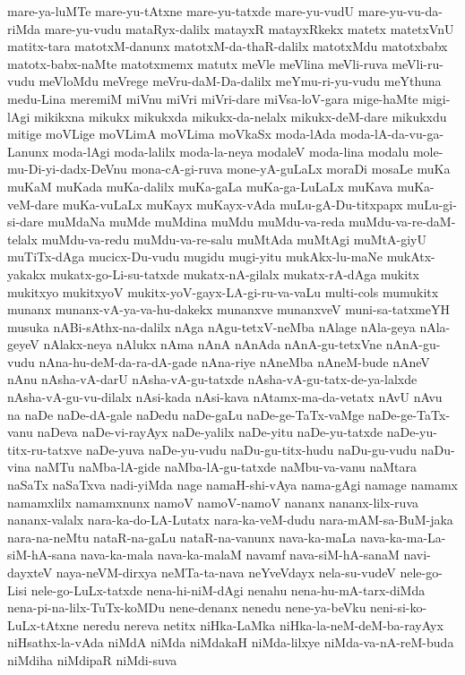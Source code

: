 {mare-ya-luMTe
mare-yu-tAtxne
mare-yu-tatxde
mare-yu-vudU
mare-yu-vu-da-riMda
mare-yu-vudu
mataRyx-dalilx
matayxR
matayxRkekx
matetx
matetxVnU
matitx-tara
matotxM-danunx
matotxM-da-thaR-dalilx
matotxMdu
matotxbabx
matotx-babx-naMte
matotxmemx
matutx
meVle
meVlina
meVli-ruva
meVli-ru-vudu
meVloMdu
meVrege
meVru-daM-Da-dalilx
meYmu-ri-yu-vudu
meYthuna
medu-Lina
meremiM
miVnu
miVri
miVri-dare
miVsa-loV-gara
mige-haMte
migi-lAgi
mikikxna
mikukx
mikukxda
mikukx-da-nelalx
mikukx-deM-dare
mikukxdu
mitige
moVLige
moVLimA
moVLima
moVkaSx
moda-lAda
moda-lA-da-vu-ga-Lanunx
moda-lAgi
moda-lalilx
moda-la-neya
modaleV
moda-lina
modalu
mole-mu-Di-yi-dadx-DeVnu
mona-cA-gi-ruva
mone-yA-guLaLx
moraDi
mosaLe
muKa
muKaM
muKada
muKa-dalilx
muKa-gaLa
muKa-ga-LuLaLx
muKava
muKa-veM-dare
muKa-vuLaLx
muKayx
muKayx-vAda
muLu-gA-Du-titxpapx
muLu-gi-si-dare
muMdaNa
muMde
muMdina
muMdu
muMdu-va-reda
muMdu-va-re-daM-telalx
muMdu-va-redu
muMdu-va-re-salu
muMtAda
muMtAgi
muMtA-giyU
muTiTx-dAga
mucicx-Du-vudu
mugidu
mugi-yitu
mukAkx-lu-maNe
mukAtx-yakakx
mukatx-go-Li-su-tatxde
mukatx-nA-gilalx
mukatx-rA-dAga
mukitx
mukitxyo
mukitxyoV
mukitx-yoV-gayx-LA-gi-ru-va-vaLu
multi-cols
mumukitx
munanx
munanx-vA-ya-va-hu-dakekx
munanxve
munanxveV
muni-sa-tatxmeYH
musuka
nABi-sAthx-na-dalilx
nAga
nAgu-tetxV-neMba
nAlage
nAla-geya
nAla-geyeV
nAlakx-neya
nAlukx
nAma
nAnA
nAnAda
nAnA-gu-tetxVne
nAnA-gu-vudu
nAna-hu-deM-da-ra-dA-gade
nAna-riye
nAneMba
nAneM-bude
nAneV
nAnu
nAsha-vA-darU
nAsha-vA-gu-tatxde
nAsha-vA-gu-tatx-de-ya-lalxde
nAsha-vA-gu-vu-dilalx
nAsi-kada
nAsi-kava
nAtamx-ma-da-vetatx
nAvU
nAvu
na
naDe
naDe-dA-gale
naDedu
naDe-gaLu
naDe-ge-TaTx-vaMge
naDe-ge-TaTx-vanu
naDeva
naDe-vi-rayAyx
naDe-yalilx
naDe-yitu
naDe-yu-tatxde
naDe-yu-titx-ru-tatxve
naDe-yuva
naDe-yu-vudu
naDu-gu-titx-hudu
naDu-gu-vudu
naDu-vina
naMTu
naMba-lA-gide
naMba-lA-gu-tatxde
naMbu-va-vanu
naMtara
naSaTx
naSaTxva
nadi-yiMda
nage
namaH-shi-vAya
nama-gAgi
namage
namamx
namamxlilx
namamxnunx
namoV
namoV-namoV
nananx
nananx-lilx-ruva
nananx-valalx
nara-ka-do-LA-Lutatx
nara-ka-veM-dudu
nara-mAM-sa-BuM-jaka
nara-na-neMtu
nataR-na-gaLu
nataR-na-vanunx
nava-ka-maLa
nava-ka-ma-La-siM-hA-sana
nava-ka-mala
nava-ka-malaM
navamf
nava-siM-hA-sanaM
navi-dayxteV
naya-neVM-dirxya
neMTa-ta-nava
neYveVdayx
nela-su-vudeV
nele-go-Lisi
nele-go-LuLx-tatxde
nena-hi-niM-dAgi
nenahu
nena-hu-mA-tarx-diMda
nena-pi-na-lilx-TuTx-koMDu
nene-denanx
nenedu
nene-ya-beVku
neni-si-ko-LuLx-tAtxne
neredu
nereva
netitx
niHka-LaMka
niHka-la-neM-deM-ba-rayAyx
niHsathx-la-vAda
niMdA
niMda
niMdakaH
niMda-lilxye
niMda-va-nA-reM-buda
niMdiha
niMdipaR
niMdi-suva
}
